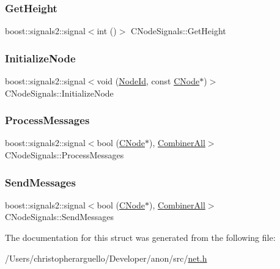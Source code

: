 \mbox{\label{struct_c_node_signals_aa9f8b7c213d6c40be77242e8cbcf46e9}} 
\subsubsection{\texorpdfstring{Get\+Height}{GetHeight}}
{\footnotesize\ttfamily boost\+::signals2\+::signal$<$int ()$>$ C\+Node\+Signals\+::\+Get\+Height}

\mbox{\label{struct_c_node_signals_a137e1854c9fea8a56e5f30be76da8b86}} 
\subsubsection{\texorpdfstring{Initialize\+Node}{InitializeNode}}
{\footnotesize\ttfamily boost\+::signals2\+::signal$<$void (\mbox{\hyperlink{net_8h_a954d746a58632565552615fd0a4ee660}{Node\+Id}}, const \mbox{\hyperlink{class_c_node}{C\+Node}}$\ast$)$>$ C\+Node\+Signals\+::\+Initialize\+Node}

\mbox{\label{struct_c_node_signals_add09b68af12ffb51821a3b8b3d6a197a}} 
\subsubsection{\texorpdfstring{Process\+Messages}{ProcessMessages}}
{\footnotesize\ttfamily boost\+::signals2\+::signal$<$bool (\mbox{\hyperlink{class_c_node}{C\+Node}}$\ast$), \mbox{\hyperlink{struct_combiner_all}{Combiner\+All}}$>$ C\+Node\+Signals\+::\+Process\+Messages}

\mbox{\label{struct_c_node_signals_a1799e65509fde2afb090d00ee6f1ab3b}} 
\subsubsection{\texorpdfstring{Send\+Messages}{SendMessages}}
{\footnotesize\ttfamily boost\+::signals2\+::signal$<$bool (\mbox{\hyperlink{class_c_node}{C\+Node}}$\ast$), \mbox{\hyperlink{struct_combiner_all}{Combiner\+All}}$>$ C\+Node\+Signals\+::\+Send\+Messages}



The documentation for this struct was generated from the following file\+:\begin{DoxyCompactItemize}
\item 
/\+Users/christopherarguello/\+Developer/anon/src/\mbox{\hyperlink{net_8h}{net.\+h}}\end{DoxyCompactItemize}
